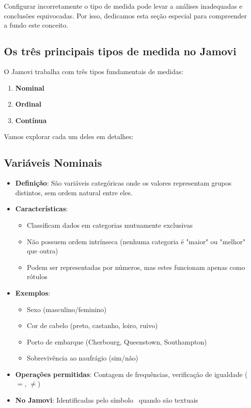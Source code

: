 Configurar incorretamente o tipo de medida pode levar a análises inadequadas e conclusões equivocadas. Por isso, dedicamos esta seção especial para compreender a fundo este conceito.

\subsection{Os três principais tipos de medida no Jamovi}

O Jamovi trabalha com três tipos fundamentais de medidas:

\begin{enumerate}
    \item \textbf{Nominal}
    \item \textbf{Ordinal}
    \item \textbf{Contínua}
\end{enumerate}

Vamos explorar cada um deles em detalhes:

\subsection{Variáveis Nominais}

\begin{itemize}
    \item \textbf{Definição}: São variáveis categóricas onde os valores representam grupos distintos, sem ordem natural entre eles.
    \item \textbf{Características}: 
    \begin{itemize}
        \item Classificam dados em categorias mutuamente exclusivas
        \item Não possuem ordem intrínseca (nenhuma categoria é "maior" ou "melhor" que outra)
        \item Podem ser representadas por números, mas estes funcionam apenas como rótulos
    \end{itemize}
    \item \textbf{Exemplos}:
    \begin{itemize}
        \item Sexo (masculino/feminino)
        \item Cor de cabelo (preto, castanho, loiro, ruivo)
        \item Porto de embarque (Cherbourg, Queenstown, Southampton)
        \item Sobrevivência ao naufrágio (sim/não)
    \end{itemize}
    \item \textbf{Operações permitidas}: Contagem de frequências, verificação de igualdade ($=$, $\neq$)
    \item \textbf{No Jamovi}: Identificadas pelo símbolo \faList\ quando são textuais
\end{itemize}


